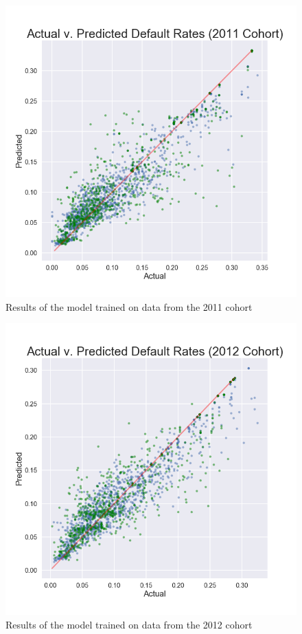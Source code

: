 \documentclass[10pt,twocolumn]{article}
\begin{document}
\begin{figure}[!t]
  \begin{center}
    \includegraphics[width=\textwidth]{results2011.png}
  \end{center}

  \caption{\Figure Results of the model trained on data from the 2011 cohort}
  \label{results2011}
\end{figure}

\begin{figure}[!t]
  \begin{center}
    \includegraphics[width=\textwidth]{results2012.png}
  \end{center}

  \caption{\Figure Results of the model trained on data from the 2012 cohort}
  \label{results2012}
\end{figure}
\end{document}
